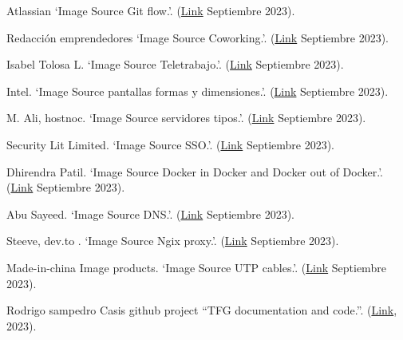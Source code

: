 \documentclass[spanish,final]{setup/eetac_tfc_pfc}
\begin{document}
\begin{thebibliography}{2}
Atlassian
`Image Source Git flow.'.
(\href{https://www.atlassian.com/es/git/tutorials/comparing-workflows/gitflow-workflow}{Link} Septiembre 2023).

Redacción emprendedores
`Image Source Coworking.'.
(\href{https://emprendedores.es/gestion/oficina-caliente-teletrabajo/}{Link} Septiembre 2023).

Isabel Tolosa L.
`Image Source Teletrabajo.'.
(\href{https://www.basepublica.cl/category/cultura-y-sociedad/}{Link} Septiembre 2023).

Intel.
`Image Source pantallas formas y dimensiones.'.
(\href{https://www.intel.la/content/www/xl/es/gaming/resources/everything-you-need-to-know-about-gaming-monitors.html}{Link} Septiembre 2023).

M. Ali, hostnoc.
`Image Source servidores tipos.'.
(\href{https://hostnoc.com/what-is-vps-hosting/}{Link} Septiembre 2023).

Security Lit Limited.
`Image Source SSO.'.
(\href{https://infosecwriteups.com/sso-a-secure-way-for-authentication-and-authorization-6a4fb8794dd6}{Link} Septiembre 2023).

Dhirendra Patil.
`Image Source Docker in Docker and Docker out of Docker.'.
(\href{https://dhirendra777.medium.com/run-docker-inside-docker-f4bce0019095}{Link} Septiembre 2023).

Abu Sayeed.
`Image Source DNS.'.
(\href{https://systemzone.net/mikrotik-dns-client-and-caching-dns-server-configuration/}{Link} Septiembre 2023).

Steeve, dev.to .
`Image Source Ngix proxy.'.
(\href{https://dev.to/steeve/manage-a-multiple-websites-server-with-docker-compose-nginx-and-auto-ssl-certificates-298}{Link} Septiembre 2023).

Made-in-china Image products.
`Image Source UTP cables.'.
(\href{https://es.made-in-china.com/co_hzspring/product_U-FTP-Cat-6A-Bc-PVC-Cm-Twisted-Pair-Installation-Cable_oyiurshog.html}{Link} Septiembre 2023).

 Rodrigo sampedro Casis github project
``TFG documentation and code.''.
(\href{https://github.com/rodrigo-sampedro/tfg_rodrigo_sc/}{Link}, 2023).

\end{thebibliography}


\pagestyle{empty}  %
\end{document}
